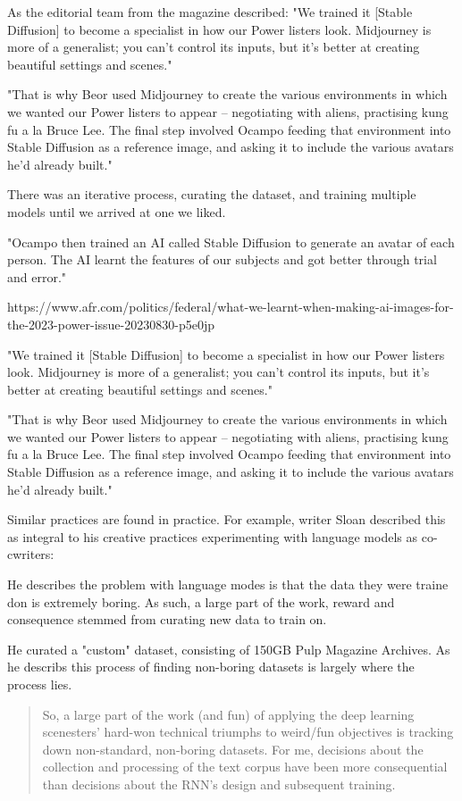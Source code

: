 As the editorial team from the magazine described: "We trained it [Stable Diffusion] to become a specialist in how our Power listers look. Midjourney is more of a generalist; you can’t control its inputs, but it’s better at creating beautiful settings and scenes."

"That is why Beor used Midjourney to create the various environments in which we wanted our Power listers to appear – negotiating with aliens, practising kung fu a la Bruce Lee. The final step involved Ocampo feeding that environment into Stable Diffusion as a reference image, and asking it to include the various avatars he’d already built."


There was an iterative process, curating the dataset, and training multiple models until we arrived at one we liked. 


"Ocampo then trained an AI called Stable Diffusion to generate an avatar of each person. The AI learnt the features of our subjects and got better through trial and error."

https://www.afr.com/politics/federal/what-we-learnt-when-making-ai-images-for-the-2023-power-issue-20230830-p5e0jp

"We trained it [Stable Diffusion] to become a specialist in how our Power listers look. Midjourney is more of a generalist; you can’t control its inputs, but it’s better at creating beautiful settings and scenes."

"That is why Beor used Midjourney to create the various environments in which we wanted our Power listers to appear – negotiating with aliens, practising kung fu a la Bruce Lee. The final step involved Ocampo feeding that environment into Stable Diffusion as a reference image, and asking it to include the various avatars he’d already built."

Similar practices are found in practice. For example, writer Sloan described this as integral to his creative practices experimenting with language models as co-cwriters:

He describes the problem with language modes is that the data they were traine don is extremely boring. 
As such, a large part of the work, reward and consequence stemmed from curating new data to train on. 

He curated a "custom" dataset, consisting of 150GB Pulp Magazine Archives. As he describs this process of finding non-boring datasets is largely where the process lies. 
\begin{quote}
    So, a large part of the work (and fun) of applying the deep learning scenesters’ hard-won technical triumphs to weird/fun objectives is tracking down non-standard, non-boring datasets. For me, decisions about the collection and processing of the text corpus have been more consequential than decisions about the RNN’s design and subsequent training.
\end{quote}


